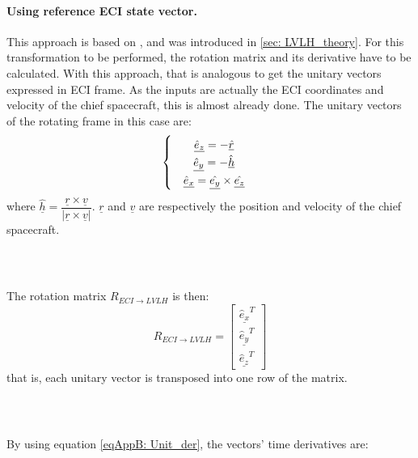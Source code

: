 		\paragraph{ Using reference ECI state vector. \\}
		 \label{sec:	LVLH_example}
		\indent This approach is based on \cite{LVLH}, and was introduced in \ref{sec:	LVLH_theory}. For this transformation to be performed, the rotation matrix and its derivative have to be calculated. With this approach, that is analogous to get the unitary vectors expressed in ECI frame. As the inputs are actually the ECI coordinates and velocity of the chief spacecraft, this is almost already done. The unitary vectors of the rotating frame in this case are:
		\begin{equation}
		\arraycolsep=10pt
		\def\arraystretch{1.3}
		\left\{ \begin{array}{ccc}
		\underline{\hat{e}_z} = - \underline{\hat{r}} \\
		\underline{\hat{e}_y} = - \underline{\hat{h}} \\		
		\underline{\hat{e}_x} = \underline{\hat{e_y}} \times \underline{\hat{e_z}} 		
		\end{array}\right.
		\end{equation}
		\noindent where $\underline{\hat{h}} = \dfrac{\underline{r} \times\underline{v}}{\lvert \underline{r} \times\underline{v} \rvert}$. $\underline{r}$ and $\underline{v}$ are respectively the position and velocity of the chief spacecraft.
			\subparagraph{ \\}
			\indent The rotation matrix $R_{ECI\to LVLH}$ is then:
			\[
			R_{ECI\to LVLH}= \left[ \begin{array}{c}
			\underline{\hat{e}_x}^T \\
			\underline{\hat{e}_y}^T \\
			\underline{\hat{e}_z}^T
			\end{array}\right]
			\]
			\noindent that is, each unitary vector is transposed into one row of the matrix.
			\subparagraph{ \\}
			\indent By using equation \eqref{eqAppB:	Unit_der}, the vectors' time derivatives are:
